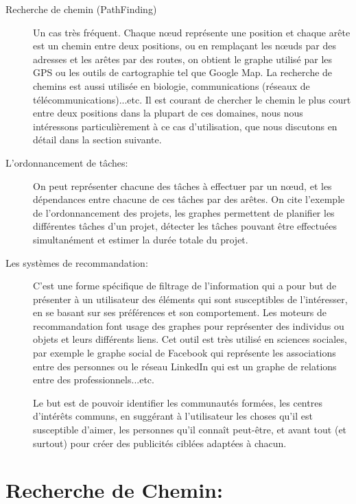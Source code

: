 \begin{description}


\item[Recherche de chemin (PathFinding)]
Un cas très fréquent. Chaque nœud représente une position et chaque arête est un chemin entre deux positions, ou en remplaçant les nœuds par des adresses et les arêtes par des routes, on obtient le graphe utilisé par les GPS ou les outils de cartographie tel que Google Map.
La recherche de chemins est aussi utilisée en biologie, communications (réseaux de télécommunications)...etc.
Il est courant de chercher le chemin le plus court entre deux positions dans la plupart de ces domaines, nous nous intéressons particulièrement à ce cas d'utilisation, que nous discutons en détail dans la section suivante.


\item[L'ordonnancement de tâches:]
On peut représenter chacune des tâches à effectuer par un nœud, et les dépendances entre chacune de ces tâches par des arêtes.
On cite l'exemple de l'ordonnancement des projets, les graphes permettent de planifier les différentes tâches d'un projet, détecter les tâches pouvant être effectuées simultanément et estimer la durée totale du projet.

\item[Les systèmes de recommandation:]
C'est une forme spécifique de filtrage de l'information qui a pour but de présenter à un utilisateur des éléments qui sont susceptibles de l'intéresser, en se basant sur ses préférences et son comportement.
Les moteurs de recommandation font usage des graphes pour représenter des individus ou objets et leurs différents liens. Cet outil est très utilisé en sciences sociales, par exemple le graphe social de Facebook qui représente les associations entre des personnes ou le réseau LinkedIn qui est un graphe de relations entre des professionnels...etc.

Le but est de pouvoir identifier les communautés formées, les centres d'intérêts communs, en suggérant à l'utilisateur les choses qu'il est susceptible d'aimer, les personnes qu'il connaît peut-être, et avant tout (et surtout) pour créer des publicités ciblées adaptées à chacun.

\end{description}

\section{Recherche de Chemin:}


